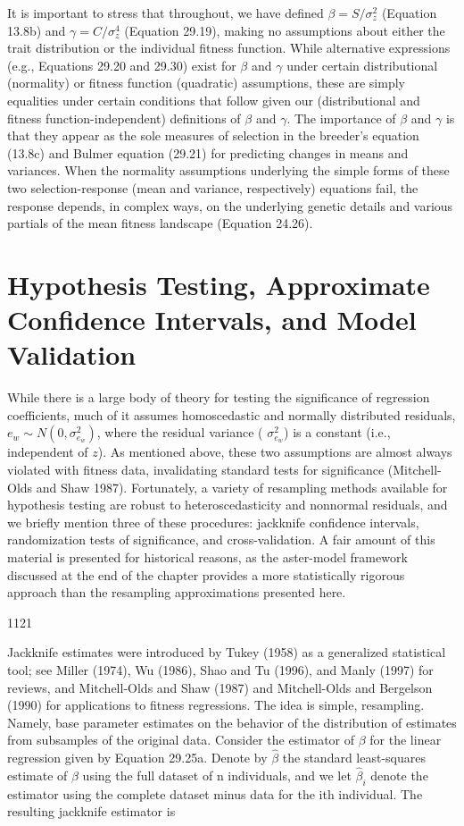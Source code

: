 \documentclass{article}
\begin{document}
It is important to stress that throughout, we have defined  $ \beta = S/\sigma_z^2 $ (Equation 13.8b) and  $ \gamma = C/\sigma_z^4 $ (Equation 29.19), making no assumptions about either the trait distribution or the individual fitness function. While alternative expressions (e.g., Equations 29.20 and 29.30) exist for  $ \beta $ and  $ \gamma $ under certain distributional (normality) or fitness function (quadratic) assumptions, these are simply equalities under certain conditions that follow given our (distributional and fitness function-independent) definitions of  $ \beta $ and  $ \gamma $. The importance of  $ \beta $ and  $ \gamma $ is that they appear as the sole measures of selection in the breeder's equation (13.8c) and Bulmer equation (29.21) for predicting changes in means and variances. When the normality assumptions underlying the simple forms of these two selection-response (mean and variance, respectively) equations fail, the response depends, in complex ways, on the underlying genetic details and various partials of the mean fitness landscape (Equation 24.26).

\section{Hypothesis Testing, Approximate Confidence Intervals, and Model Validation}
While there is a large body of theory for testing the significance of regression coefficients, much of it assumes homoscedastic and normally distributed residuals,  $ e_w \sim N(0, \sigma_{e_w}^2) $, where the residual variance ( $ \sigma_{e_w}^2 $) is a constant (i.e., independent of  $ z $). As mentioned above, these two assumptions are almost always violated with fitness data, invalidating standard tests for significance (Mitchell-Olds and Shaw 1987). Fortunately, a variety of resampling methods available for hypothesis testing are robust to heteroscedasticity and nonnormal residuals, and we briefly mention three of these procedures: jackknife confidence intervals, randomization tests of significance, and cross-validation. A fair amount of this material is presented for historical reasons, as the aster-model framework discussed at the end of the chapter provides a more statistically rigorous approach than the resampling approximations presented here.

1121

Jackknife estimates were introduced by Tukey (1958) as a generalized statistical tool; see Miller (1974), Wu (1986), Shao and Tu (1996), and Manly (1997) for reviews, and Mitchell-Olds and Shaw (1987) and Mitchell-Olds and Bergelson (1990) for applications to fitness regressions. The idea is simple, resampling. Namely, base parameter estimates on the behavior of the distribution of estimates from subsamples of the original data. Consider the estimator of  $ \beta $ for the linear regression given by Equation 29.25a. Denote by  $ \widehat{\beta} $ the standard least-squares estimate of  $ \beta $ using the full dataset of n individuals, and we let  $ \widehat{\beta}_{i} $ denote the estimator using the complete dataset minus data for the ith individual. The resulting jackknife estimator is
\end{document}
